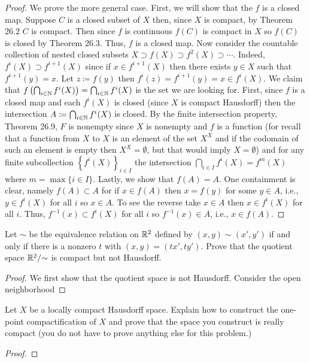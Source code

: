 \begin{proof}
We prove the more general case. First, we will show that the $f$ is a
closed map. Suppose $C$ is a closed subset of $X$ then, since $X$ is
compact, by Theorem 26.2 $C$ is compact. Then since $f$ is continuous
$f(C)$ is compact in $X$ so $f(C)$ is closed by Theorem 26.3. Thus, $f$ is
a closed map. Now consider the countable collection of nested closed
subsets $X\supset f(X)\supset f^2(X)\supset\cdots$. Indeed, $f^i(X)\supset
f^{i+1}(X)$ since if $x\in f^{i+1}(X)$ then there exists $y\in X$ such that
$f^{i+1}(y)=x$. Let $z\coloneqq f(y)$ then $f^i(z)=f^{i+1}(y)=x\in
f^i(X)$. We claim that
$f\left(\bigcap_{i\in\mathbb{N}}f^i(X)\right)=\bigcap_{i\in\mathbb{N}}f^{i}(X)$ is the
set we are looking for. First, since $f$ is a closed map and each $f^i(X)$
is closed (since $X$ is compact Hausdorff) then the intersection
$A\coloneqq\bigcap_{i\in\mathbb{N}} f^i(X)$ is closed. By the finite intersection
property, Theorem 26.9, $F$ is nonempty since $X$ is nonempty and $f$ is a
function (for recall that a function from $X$ to $X$ is an element of the
set $X^X$ and if the codomain of such an element is empty then
$X^X=\emptyset$, but that would imply $X=\emptyset$) and for any finite
subcollection $\left\{f^i(X)\right\}_{i\in I}$ the intersection
$\bigcap_{i\in I}f^i(X)=f^m(X)$ where $m=\max\{i\in I\}$. Lastly, we show
that $f(A)=A$. One containment is clear, namely
$f\left(A\right)\subset A$ for if $x\in f(A)$ then $x=f(y)$ for some $y\in
A$, i.e., $y\in f^i(X)$ for all $i$ so $x\in A$. To see the reverse take
$x\in A$ then $x\in f^i(X)$ for all $i$. Thus, $f^{-1}(x)\subset f^i(X)$
for all $i$ so $f^{-1}(x)\in A$, i.e., $x\in f(A)$.
\end{proof}
\begin{problem}
Let $\sim$ be the equivalence relation on $\mathbb{R}^2$ defined by
$(x,y)\sim(x',y')$ if and only if there is a nonzero $t$ with
$(x,y)=(tx',ty')$. Prove that the quotient space $\mathbb{R}^2/{\sim}$
is compact but not Hausdorff.
\end{problem}
\begin{proof}
We first show that the quotient space is not Hausdorff. Consider the open
neighborhood
\end{proof}
\begin{problem}
Let $X$ be a locally compact Hausdorff space. Explain how to
construct the one-point compactification of $X$ and prove that
the space you construct is really compact (you do not have to
prove anything else for this problem.)
\end{problem}
\begin{proof}
\end{proof}
